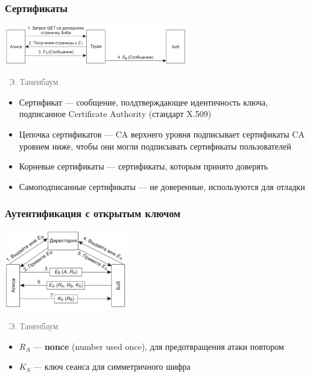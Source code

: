 \documentclass[xetex,mathserif,serif]{beamer}
\newcommand{\attribution}[1] {
\vspace{-5mm}\begin{flushright}\begin{scriptsize}\textcolor{gray}{\textcopyright\, #1}\end{scriptsize}\end{flushright}
}
\begin{document}
	\begin{frame}
		\frametitle{Сертификаты}
		\begin{center}
			\includegraphics[width=0.6\textwidth]{manInTheMiddle.png}
			\attribution{Э. Таненбаум}
		\end{center}
		\begin{itemize}
			\item Сертификат --- сообщение, полдтверждающее идентичность ключа, подписанное Certificate Authority (стандарт X.509)
			\item Цепочка сертификатов --- CA верхнего уровня подписывает сертификаты CA уровнем ниже, чтобы они могли подписывать сертификаты пользователей
			\item Корневые сертификаты --- сертификаты, которым принято доверять
			\item Самоподписанные сертификаты --- не доверенные, используются для отладки
		\end{itemize}
	\end{frame}

	\begin{frame}
		\frametitle{Аутентификация с открытым ключом}
		\begin{center}
			\includegraphics[width=0.4\textwidth]{authentication.png}
			\attribution{Э. Таненбаум}
		\end{center}
		\begin{itemize}
			\item $R_A$ --- \textbf{nonce} (number used once), для предотвращения атаки повтором
			\item $K_S$ --- ключ сеанса для симметричного шифра
		\end{itemize}
	\end{frame}
\end{document}
